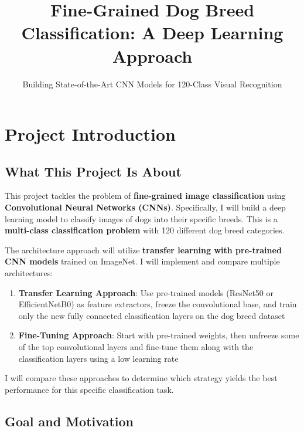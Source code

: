 \documentclass[
  letterpaper,
  DIV=11,
  numbers=noendperiod]{scrartcl}
\title{Fine-Grained Dog Breed Classification: A Deep Learning Approach}
\subtitle{Building State-of-the-Art CNN Models for 120-Class Visual
Recognition}
\author{}
\date{}
\providecommand{\tightlist}{%
  \setlength{\itemsep}{0pt}\setlength{\parskip}{0pt}}
\renewcommand*\contentsname{Table of contents}
\newcommand\contentsname{Table of contents}
\begin{document}
\maketitle

\renewcommand*\contentsname{Table of contents}
{
\hypersetup{linkcolor=}
\setcounter{tocdepth}{3}
\tableofcontents
}

\section{Project Introduction}\label{project-introduction}

\subsection{What This Project Is
About}\label{what-this-project-is-about}

This project tackles the problem of \textbf{fine-grained image
classification} using \textbf{Convolutional Neural Networks (CNNs)}.
Specifically, I will build a deep learning model to classify images of
dogs into their specific breeds. This is a \textbf{multi-class
classification problem} with 120 different dog breed categories.

The architecture approach will utilize \textbf{transfer learning with
pre-trained CNN models} trained on ImageNet. I will implement and
compare multiple architectures:

\begin{enumerate}
\def\labelenumi{\arabic{enumi}.}
\tightlist
\item
  \textbf{Transfer Learning Approach}: Use pre-trained models (ResNet50
  or EfficientNetB0) as feature extractors, freeze the convolutional
  base, and train only the new fully connected classification layers on
  the dog breed dataset
\item
  \textbf{Fine-Tuning Approach}: Start with pre-trained weights, then
  unfreeze some of the top convolutional layers and fine-tune them along
  with the classification layers using a low learning rate
\end{enumerate}

I will compare these approaches to determine which strategy yields the
best performance for this specific classification task.

\subsection{Goal and Motivation}\label{goal-and-motivation}
\end{document}
